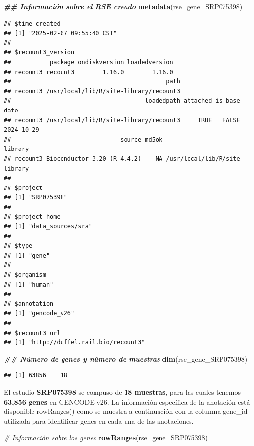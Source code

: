 \documentclass[
]{article}
\newenvironment{Shaded}{\begin{snugshade}}{\end{snugshade}}
\newcommand{\CommentTok}[1]{\textcolor[rgb]{0.56,0.35,0.01}{\textit{#1}}}
\newcommand{\DocumentationTok}[1]{\textcolor[rgb]{0.56,0.35,0.01}{\textbf{\textit{#1}}}}
\newcommand{\FunctionTok}[1]{\textcolor[rgb]{0.13,0.29,0.53}{\textbf{#1}}}
\newcommand{\NormalTok}[1]{#1}
\begin{document}
\begin{Shaded}
\begin{Highlighting}[]
\DocumentationTok{\#\# Información sobre el RSE creado}
\FunctionTok{metadata}\NormalTok{(rse\_gene\_SRP075398)}
\end{Highlighting}
\end{Shaded}

\begin{verbatim}
## $time_created
## [1] "2025-02-07 09:55:40 CST"
## 
## $recount3_version
##           package ondiskversion loadedversion
## recount3 recount3        1.16.0        1.16.0
##                                            path
## recount3 /usr/local/lib/R/site-library/recount3
##                                      loadedpath attached is_base       date
## recount3 /usr/local/lib/R/site-library/recount3     TRUE   FALSE 2024-10-29
##                               source md5ok                       library
## recount3 Bioconductor 3.20 (R 4.4.2)    NA /usr/local/lib/R/site-library
## 
## $project
## [1] "SRP075398"
## 
## $project_home
## [1] "data_sources/sra"
## 
## $type
## [1] "gene"
## 
## $organism
## [1] "human"
## 
## $annotation
## [1] "gencode_v26"
## 
## $recount3_url
## [1] "http://duffel.rail.bio/recount3"
\end{verbatim}

\begin{Shaded}
\begin{Highlighting}[]
\DocumentationTok{\#\# Número de genes y número de muestras}
\FunctionTok{dim}\NormalTok{(rse\_gene\_SRP075398)}
\end{Highlighting}
\end{Shaded}

\begin{verbatim}
## [1] 63856    18
\end{verbatim}

El estudio \textbf{SRP075398} se compuso de \textbf{18 muestras}, para
las cuales tenemos \textbf{63,856 genes} en GENCODE v26. La información
específica de la anotación está disponible rowRanges() como se muestra a
continuación con la columna gene\_id utilizada para identificar genes en
cada una de las anotaciones.

\begin{Shaded}
\begin{Highlighting}[]
\CommentTok{\# Información sobre los genes}
\FunctionTok{rowRanges}\NormalTok{(rse\_gene\_SRP075398)}
\end{Highlighting}
\end{Shaded}
\end{document}
